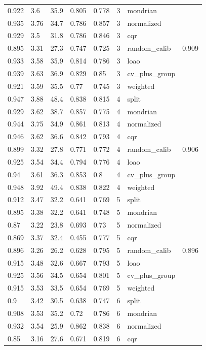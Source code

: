 \begin{tabular}{llllllll}
0.922 & 3.6 & 35.9 & 0.805 & 0.778 & 3 & mondrian &  \\
0.935 & 3.76 & 34.7 & 0.786 & 0.857 & 3 & normalized &  \\
0.929 & 3.5 & 31.8 & 0.786 & 0.846 & 3 & cqr &  \\
0.895 & 3.31 & 27.3 & 0.747 & 0.725 & 3 & random\_calib & 0.909 \\
0.933 & 3.58 & 35.9 & 0.814 & 0.786 & 3 & loao &  \\
0.939 & 3.63 & 36.9 & 0.829 & 0.85 & 3 & cv\_plus\_group &  \\
0.921 & 3.59 & 35.5 & 0.77 & 0.745 & 3 & weighted &  \\
0.947 & 3.88 & 48.4 & 0.838 & 0.815 & 4 & split &  \\
0.929 & 3.62 & 38.7 & 0.857 & 0.775 & 4 & mondrian &  \\
0.944 & 3.75 & 34.9 & 0.861 & 0.813 & 4 & normalized &  \\
0.946 & 3.62 & 36.6 & 0.842 & 0.793 & 4 & cqr &  \\
0.899 & 3.32 & 27.8 & 0.771 & 0.772 & 4 & random\_calib & 0.906 \\
0.925 & 3.54 & 34.4 & 0.794 & 0.776 & 4 & loao &  \\
0.94 & 3.61 & 36.3 & 0.853 & 0.8 & 4 & cv\_plus\_group &  \\
0.948 & 3.92 & 49.4 & 0.838 & 0.822 & 4 & weighted &  \\
0.912 & 3.47 & 32.2 & 0.641 & 0.769 & 5 & split &  \\
0.895 & 3.38 & 32.2 & 0.641 & 0.748 & 5 & mondrian &  \\
0.87 & 3.22 & 23.8 & 0.693 & 0.73 & 5 & normalized &  \\
0.869 & 3.37 & 32.4 & 0.455 & 0.777 & 5 & cqr &  \\
0.896 & 3.26 & 26.2 & 0.628 & 0.795 & 5 & random\_calib & 0.896 \\
0.915 & 3.48 & 32.6 & 0.667 & 0.793 & 5 & loao &  \\
0.925 & 3.56 & 34.5 & 0.654 & 0.801 & 5 & cv\_plus\_group &  \\
0.915 & 3.53 & 33.5 & 0.654 & 0.769 & 5 & weighted &  \\
0.9 & 3.42 & 30.5 & 0.638 & 0.747 & 6 & split &  \\
0.908 & 3.53 & 35.2 & 0.72 & 0.786 & 6 & mondrian &  \\
0.932 & 3.54 & 25.9 & 0.862 & 0.838 & 6 & normalized &  \\
0.85 & 3.16 & 27.6 & 0.671 & 0.819 & 6 & cqr &  \\

\end{tabular}
